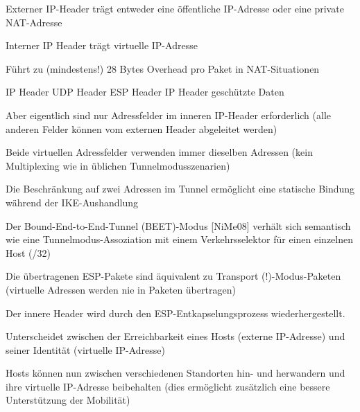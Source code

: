 \documentclass[a4paper]{article}
\begin{document}
\begin{multicols}{3}
\begin{itemize*}
\begin{itemize*}
                  \begin{itemize*}
                        \item Externer IP-Header trägt entweder eine öffentliche IP-Adresse oder eine private NAT-Adresse
                        \item Interner IP Header trägt virtuelle IP-Adresse
                        \item Führt zu (mindestens!) 28 Bytes Overhead pro Paket in NAT-Situationen
                        \item \textbar{} IP Header \textbar{} UDP Header \textbar{} ESP Header \textbar{} IP Header \textbar{} geschützte Daten \textbar{}
                  \end{itemize*}
                  \item
                  Aber eigentlich sind nur Adressfelder im inneren IP-Header
                  erforderlich (alle anderen Felder können vom externen Header
                  abgeleitet werden)
                  \item
                  Beide virtuellen Adressfelder verwenden immer dieselben Adressen (kein
                  Multiplexing wie in üblichen Tunnelmodusszenarien)
                  \item
                  Die Beschränkung auf zwei Adressen im Tunnel ermöglicht eine statische
                  Bindung während der IKE-Aushandlung
                  \item
                  Der Bound-End-to-End-Tunnel (BEET)-Modus {[}NiMe08{]} verhält sich
                  semantisch wie eine Tunnelmodus-Assoziation mit einem Verkehrsselektor
                  für einen einzelnen Host (/32)
                  \item
                  Die übertragenen ESP-Pakete sind äquivalent zu Transport
                  (!)-Modus-Paketen (virtuelle Adressen werden nie in Paketen
                  übertragen)
                  \item
                  Der innere Header wird durch den ESP-Entkapselungsprozess
                  wiederhergestellt.
                  \item
                  Unterscheidet zwischen der Erreichbarkeit eines Hosts (externe
                  IP-Adresse) und seiner Identität (virtuelle IP-Adresse)
                  \item
                  Hosts können nun zwischen verschiedenen Standorten hin- und herwandern
                  und ihre virtuelle IP-Adresse beibehalten (dies ermöglicht zusätzlich
                  eine bessere Unterstützung der Mobilität)
            \end{itemize*}



\end{itemize*}
\end{multicols}
\end{document}
